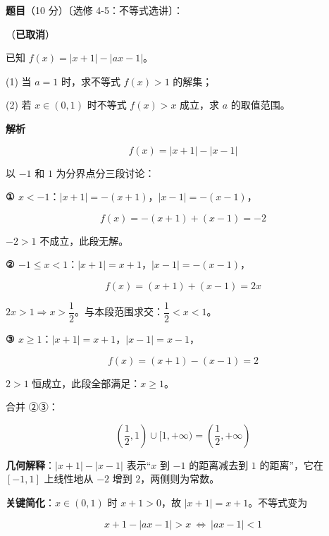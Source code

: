 \begin{answer}

\textbf{题目}（10 分）〔选修 4-5：不等式选讲〕：

（\textbf{已取消}）

已知 $f(x)=|x+1|-|ax-1|$。

  (1) 当 $a=1$ 时，求不等式 $f(x)>1$ 的解集；

  (2) 若 $x\in(0,1)$ 时不等式 $f(x)>x$ 成立，求 $a$ 的取值范围。

\par\medskip

\textbf{解析}


\nopagebreak[4]
\[f(x)=|x+1|-|x-1|\]

以 $-1$ 和 $1$ 为分界点分三段讨论：

\textbf{① $x<-1$}：$|x+1|=-(x+1)$，$|x-1|=-(x-1)$，

\nopagebreak[4]
\[f(x)=-(x+1)+(x-1)=-2\]

$-2>1$ 不成立，此段无解。

\textbf{② $-1\le x<1$}：$|x+1|=x+1$，$|x-1|=-(x-1)$，

\nopagebreak[4]
\[f(x)=(x+1)+(x-1)=2x\]

$2x>1\Rightarrow x>\dfrac12$。与本段范围求交：$\dfrac12<x<1$。

\textbf{③ $x\ge1$}：$|x+1|=x+1$，$|x-1|=x-1$，

\nopagebreak[4]
\[f(x)=(x+1)-(x-1)=2\]

$2>1$ 恒成立，此段全部满足：$x\ge1$。

合并 ②③：

\nopagebreak[4]
\[\left(\frac12,1\right)\cup[1,+\infty)=\left(\frac12,+\infty\right)\]

\begin{gktip}
\textbf{几何解释}：$|x+1|-|x-1|$ 表示“$x$ 到 $-1$ 的距离减去到 $1$ 的距离”，它在 $[-1,1]$ 上线性地从 $-2$ 增到 $2$，两侧则为常数。
\end{gktip}


\textbf{关键简化}：$x\in(0,1)$ 时 $x+1>0$，故 $|x+1|=x+1$。不等式变为

\nopagebreak[4]
\[x+1-|ax-1|>x\ \Longleftrightarrow\ |ax-1|<1\]


\end{answer}
